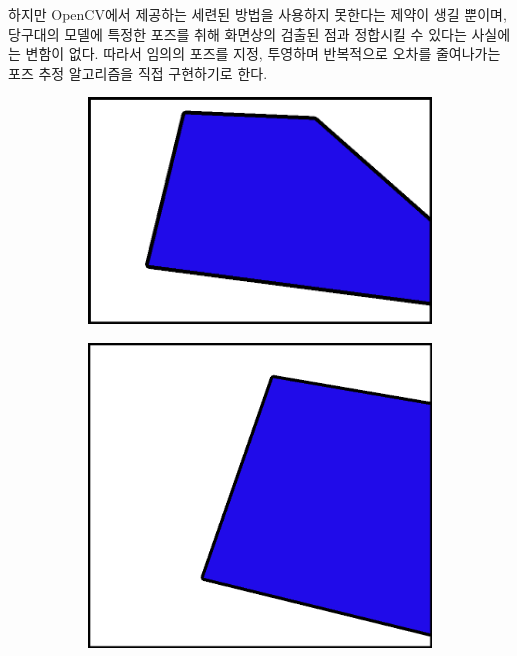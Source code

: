 \documentclass[10pt]{oblivoir}
\begin{document}
하지만 OpenCV에서 제공하는 세련된 방법을 사용하지 못한다는 제약이 생길 뿐이며, 당구대의 모델에 특정한 포즈를 취해 화면상의 검출된 점과 정합시킬 수 있다는 사실에는 변함이 없다. 따라서 임의의 포즈를 지정, 투영하며 반복적으로 오차를 줄여나가는 포즈 추정 알고리즘을 직접 구현하기로 한다.

\begin{figure}
    \centering 
    \begin{subfigure}{3.5cm}
        \includegraphics[width=\textwidth]{img/table-partial-view-filter-0.png}
        \caption{}
        \label{fig;table-partial-0}
    \end{subfigure}
    \begin{subfigure}{3.5cm}
        \includegraphics[width=\textwidth]{img/table-partial-view-filter-1.png}

\end{subfigure}
\end{figure}
\end{document}
